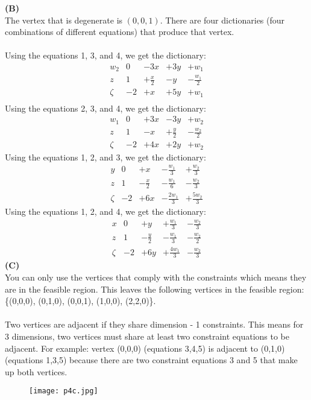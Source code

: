 \documentclass[11pt]{article}
\begin{document}
\noindent\textbf{(B)}
\\
The vertex that is degenerate is $(0,0,1)$. There are four dictionaries (four combinations of different equations) that produce that vertex.\\
\\
Using the equations 1, 3, and 4, we get the dictionary:
\[\begin{array}{r|ccccc}
w_2 & 0 & -3x & +3y & +w_1 \\
z & 1 & +\frac{x}{2} & -y & -\frac{w_1}{2} \\
\hline
\zeta & -2 & +x & +5y & +w_1 \\
\end{array}\]
Using the equations 2, 3, and 4, we get the dictionary:
\[\begin{array}{r|ccccc}
w_1 & 0 & +3x & -3y & +w_2 \\
z & 1 & -x & +\frac{y}{2} & -\frac{w_2}{2} \\
\hline
\zeta & -2 & +4x & +2y & +w_2
\end{array}\]
Using the equations 1, 2, and 3, we get the dictionary:
\[\begin{array}{r|ccccc}
y & 0 & +x & -\frac{w_1}{3} & +\frac{w_2}{3} \\
z & 1 & -\frac{x}{2} & -\frac{w_1}{6} & -\frac{w_2}{3} \\
\hline
\zeta & -2 & +6x & -\frac{2w_1}{3} & +\frac{5w_2}{3}
\end{array}\]
Using the equations 1, 2, and 4, we get the dictionary:
\[\begin{array}{r|ccccc}
x & 0 & +y & +\frac{w_1}{3} & -\frac{w_2}{3} \\
z & 1 & -\frac{y}{2} & -\frac{w_1}{3} & -\frac{w_2}{2} \\
\hline
\zeta & -2 & +6y & +\frac{4w_1}{3} & -\frac{w_2}{3}
\end{array}\]
\noindent\textbf{(C)}
\\
You can only use the vertices that comply with the constraints which means they are in the feasible region.  This leaves the following vertices in the feasible region: \{(0,0,0), (0,1,0), (0,0,1), (1,0,0), (2,2,0)\}.\\
\\
Two vertices are adjacent if they share dimension - 1 constraints.  This means for 3 dimensions, two vertices must share at least two constraint equations to be adjacent.  For example: vertex (0,0,0) (equations 3,4,5) is adjacent to (0,1,0) (equations 1,3,5) because there are two constraint equations 3 and 5 that make up both vertices. 
\begin{figure}[h]
\centering
\texttt{[image: p4c.jpg]}
\end{figure}
\end{document}
